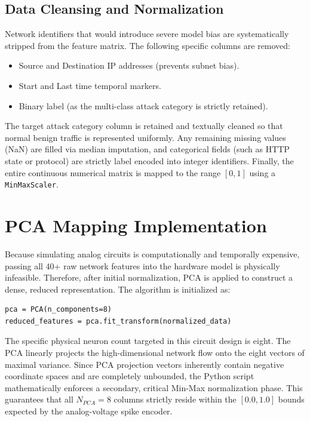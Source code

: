 \subsection{Data Cleansing and Normalization}
Network identifiers that would introduce severe model bias are systematically stripped from the feature matrix. The following specific columns are removed:
\begin{itemize}
\item Source and Destination IP addresses (prevents subnet bias).
\item Start and Last time temporal markers.
\item Binary label (as the multi-class attack category is strictly retained).
\end{itemize}

The target attack category column is retained and textually cleaned so that normal benign traffic is represented uniformly. Any remaining missing values (NaN) are filled via median imputation, and categorical fields (such as HTTP state or protocol) are strictly label encoded into integer identifiers. Finally, the entire continuous numerical matrix is mapped to the range $[0, 1]$ using a \texttt{MinMaxScaler}.

\section{PCA Mapping Implementation}

Because simulating analog circuits is computationally and temporally expensive, passing all 40+ raw network features into the hardware model is physically infeasible. Therefore, after initial normalization, PCA is applied to construct a dense, reduced representation. The algorithm is initialized as:
\begin{verbatim}
pca = PCA(n_components=8)
reduced_features = pca.fit_transform(normalized_data)
\end{verbatim}

The specific physical neuron count targeted in this circuit design is eight. The PCA linearly projects the high-dimensional network flow onto the eight vectors of maximal variance. Since PCA projection vectors inherently contain negative coordinate spaces and are completely unbounded, the Python script mathematically enforces a secondary, critical Min-Max normalization phase. This guarantees that all $N_{PCA}=8$ columns strictly reside within the $[0.0, 1.0]$ bounds expected by the analog-voltage spike encoder. 

